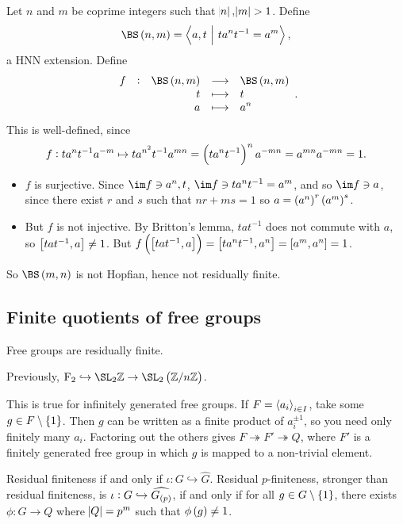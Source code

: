 \begin{example}
Let $ n $ and $ m $ be coprime integers such that $ \abs{n}, \abs{m} > 1 $. Define
$$ \BS\br{n, m} = \abr{a, t \st ta^nt^{-1} = a^m}, $$
a HNN extension. Define
$$ \functions[f]{\BS\br{n, m}}{\BS\br{n, m}}{t}{t}{a}{a^n}. $$
This is well-defined, since
$$ f : ta^nt^{-1}a^{-m} \mapsto ta^{n^2}t^{-1}a^{mn} = \br{ta^nt^{-1}}^na^{-mn} = a^{mn}a^{-mn} = 1. $$
\begin{itemize}
\item $ f $ is surjective. Since $ \im f \ni a^n, t $, $ \im f \ni ta^nt^{-1} = a^m $, and so $ \im f \ni a $, since there exist $ r $ and $ s $ such that $ nr + ms = 1 $ so $ a = \br{a^n}^r\br{a^m}^s $.
\item But $ f $ is not injective. By Britton's lemma, $ tat^{-1} $ does not commute with $ a $, so $ \sbr{tat^{-1}, a} \ne 1 $. But $ f\br{\sbr{tat^{-1}, a}} = \sbr{ta^nt^{-1}, a^n} = \sbr{a^m, a^n} = 1 $.
\end{itemize}
So $ \BS\br{m, n} $ is not Hopfian, hence not residually finite.
\end{example}

\subsection{Finite quotients of free groups}


\begin{theorem}
Free groups are residually finite.
\end{theorem}

Previously, $ \F_2 \hookrightarrow \SL_2 \ZZ \to \SL_2 \br{\ZZ / n\ZZ} $.

\begin{remark}
This is true for infinitely generated free groups. If $ F = \left\langle a_i \right\rangle_{i \in I} $, take some $ g \in F \setminus \cbr{1} $. Then $ g $ can be written as a finite product of $ a_i^{\pm 1} $, so you need only finitely many $ a_i $. Factoring out the others gives $ F \twoheadrightarrow F' \twoheadrightarrow Q $, where $ F' $ is a finitely generated free group in which $ g $ is mapped to a non-trivial element.
\end{remark}

Residual finiteness if and only if $ \iota : G \hookrightarrow \widehat{G} $. Residual $ p $-finiteness, stronger than residual finiteness, is $ \iota : G \hookrightarrow \widehat{G_{\br{p}}} $, if and only if for all $ g \in G \setminus \cbr{1} $, there exists $ \phi : G \to Q $ where $ \abs{Q} = p^m $ such that $ \phi\br{g} \ne 1 $.

